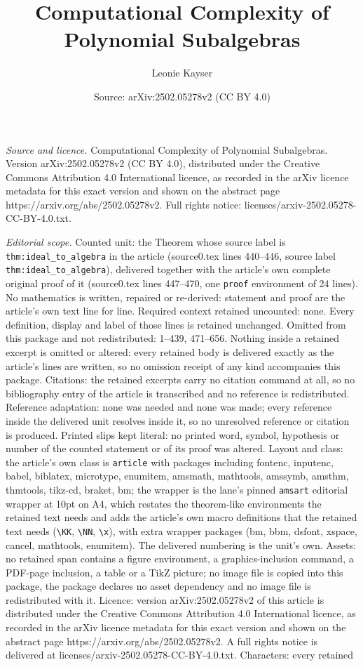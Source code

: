 \documentclass[10pt,a4paper]{amsart}
\title[Computational Complexity of Polynomial Subalgebras]{Computational Complexity of Polynomial Subalgebras}
\author{Leonie Kayser}
\date{Source: arXiv:2502.05278v2 (CC BY 4.0)}
\begin{document}
\maketitle

\noindent\emph{Source and licence.} Computational Complexity of Polynomial Subalgebras. Version arXiv:2502.05278v2 (CC BY 4.0), distributed under the Creative Commons Attribution 4.0 International licence, as recorded in the arXiv licence metadata for this exact version and shown on the abstract page https://arxiv.org/abs/2502.05278v2. Full rights notice: licenses/arxiv-2502.05278-CC-BY-4.0.txt.\par\smallskip

\noindent\textit{Editorial scope.} Counted unit: the Theorem whose source label is \texttt{thm:ideal\_to\_algebra} in the article (source0.tex lines 440--446, source label \texttt{thm:ideal\_to\_algebra}), delivered together with the article's own complete original proof of it (source0.tex lines 447--470, one \texttt{proof} environment of 24 lines). No mathematics is written, repaired or re-derived: statement and proof are the article's own text line for line. Required context retained uncounted: none. Every definition, display and label of those lines is retained unchanged. Omitted from this package and not redistributed: 1--439, 471--656. Nothing inside a retained excerpt is omitted or altered: every retained body is delivered exactly as the article's lines are written, so no omission receipt of any kind accompanies this package. Citations: the retained excerpts carry no citation command at all, so no bibliography entry of the article is transcribed and no reference is redistributed. Reference adaptation: none was needed and none was made; every reference inside the delivered unit resolves inside it, so no unresolved reference or citation is produced. Printed slips kept literal: no printed word, symbol, hypothesis or number of the counted statement or of its proof was altered. Layout and class: the article's own class is \texttt{article} with packages including fontenc, inputenc, babel, biblatex, microtype, enumitem, amsmath, mathtools, amssymb, amsthm, thmtools, tikz-cd, braket, bm; the wrapper is the lane's pinned \texttt{amsart} editorial wrapper at 10pt on A4, which restates the theorem-like environments the retained text needs and adds the article's own macro definitions that the retained text needs (\texttt{\textbackslash KK}, \texttt{\textbackslash NN}, \texttt{\textbackslash x}), with extra wrapper packages (bm, bbm, dsfont, xspace, cancel, mathtools, enumitem). The delivered numbering is the unit's own. Assets: no retained span contains a figure environment, a graphics-inclusion command, a PDF-page inclusion, a table or a TikZ picture; no image file is copied into this package, the package declares no asset dependency and no image file is redistributed with it. Licence: version arXiv:2502.05278v2 of this article is distributed under the Creative Commons Attribution 4.0 International licence, as recorded in the arXiv licence metadata for this exact version and shown on the abstract page https://arxiv.org/abs/2502.05278v2. A full rights notice is delivered at licenses/arxiv-2502.05278-CC-BY-4.0.txt. Characters: every retained 
\end{document}
